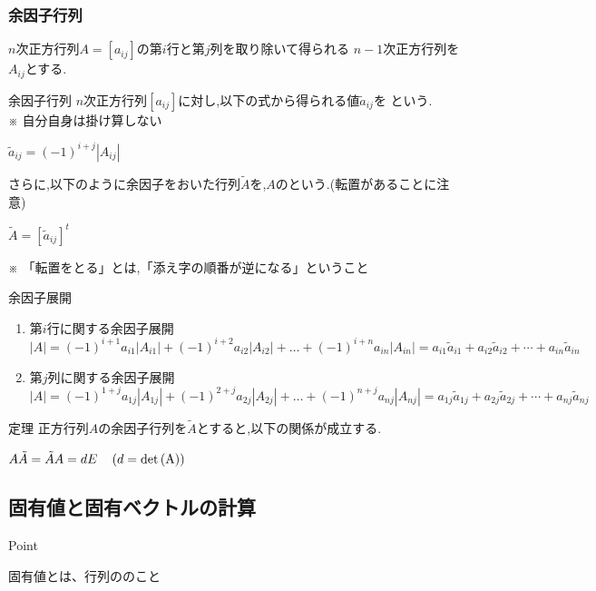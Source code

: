 \documentclass[a4paper]{jsarticle}
\begin{document}
\subsubsection{余因子行列}
$n$次正方行列$A=\left[a_{ij}\right]$の第$i$行と第$j$列を取り除いて得られる
$n-1$次正方行列を$A_{ij}$とする.
\begin{itembox}[l]{余因子行列}
    $n$次正方行列$\left[a_{ij}\right]$に対し,以下の式から得られる値$\tilde{a}_{ij}$を
    という.\\
    ※ 自分自身は掛け算しない
    \begin{center}
        $\tilde{a}_{ij}=\left(-1\right)^{i+j}\left|A_{ij}\right|$
    \end{center}
    さらに,以下のように余因子をおいた行列$\tilde{A}$を,$A$のという.(転置があることに注意)
    \begin{center}
        $\tilde{A}=\left[\tilde{a}_{ij}\right]^t$
    \end{center}
    ※ 「転置をとる」とは,「添え字の順番が逆になる」ということ
\end{itembox}
\begin{itembox}[l]{余因子展開}
    \begin{enumerate}[(1)]
        \item 第$i$行に関する余因子展開\\
              $\left|A\right|=(-1)^{i+1}a_{i1}\left|A_{i1}\right|+(-1)^{i+2}a_{i2}\left|A_{i2}\right|+ \dots +(-1)^{i+n}a_{in}\left|A_{in}\right|
                  =a_{i1}\tilde{a}_{i1}+a_{i2}\tilde{a}_{i2}+\cdots +a_{in}\tilde{a}_{in}$
        \item 第$j$列に関する余因子展開\\
              $\left|A\right|=(-1)^{1+j}a_{1j}\left|A_{1j}\right|+(-1)^{2+j}a_{2j}\left|A_{2j}\right|+ \dots +(-1)^{n+j}a_{nj}\left|A_{nj}\right|
                  =a_{1j}\tilde{a}_{1j}+a_{2j}\tilde{a}_{2j}+\cdots +a_{nj}\tilde{a}_{nj}$
    \end{enumerate}
\end{itembox}
\begin{itembox}[l]{定理}
    正方行列$A$の余因子行列を$\tilde{A}$とすると,以下の関係が成立する.
    \begin{center}
        $A\tilde{A}=\tilde{A}A=dE\quad\left(d=\rm{det}\left(A\right)\right)$
    \end{center}
\end{itembox}
\subsection{固有値と固有ベクトルの計算}
\begin{itembox}[l]{Point}
    \begin{center}
        固有値とは、行列ののこと
    \end{center}
\end{itembox}
\end{document}
